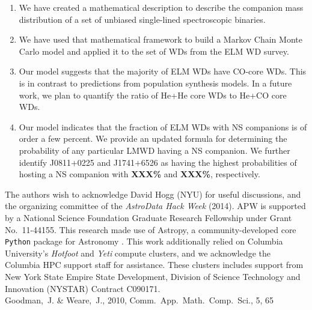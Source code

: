 \documentclass[apjl]{emulateapj}
\begin{document}
\begin{enumerate}
\item We have created a mathematical description to describe the companion mass distribution of a set of unbiased single-lined spectroscopic binaries. \\
\item We have used that mathematical framework to build a Markov Chain Monte Carlo model and applied it to the set of WDs from the ELM WD survey. \\
\item Our model suggests that the majority of ELM WDs have CO-core WDs. This is in contrast to predictions from population synthesis models. In a future work, we plan to quantify the ratio of He+He core WDs to He+CO core WDs. \\
\item Our model indicates that the fraction of ELM WDs with NS companions is of order a few percent. We provide an updated formula for determining the probability of any particular LMWD having a NS companion. We further identify J0811$+$0225 and J1741$+$6526 as having the highest probabilities of hosting a NS companion with {\bf XXX\%} and {\bf XXX\%}, respectively. \\
\end{enumerate}

\acknowledgements
The authors wish to acknowledge David Hogg (NYU) for useful discussions, and the organizing committee of the \emph{AstroData Hack Week} (2014). 
APW is supported by a National Science Foundation Graduate Research Fellowship under Grant No.\ 11-44155. 
This research made use of Astropy, a community-developed core \texttt{Python} package for Astronomy \citep{astropy13}.
This work additionally relied on Columbia University's \emph{Hotfoot} and \emph{Yeti} compute clusters, and we acknowledge the Columbia HPC support staff for assistance. These clusters includes support from New York State Empire State Development, Division of Science Technology and Innovation (NYSTAR) Contract C090171. \\




Goodman,~J. \& Weare,\ J.,
2010, Comm.\ App.\ Math.\ Comp.\ Sci., 5, 65
\end{document}
